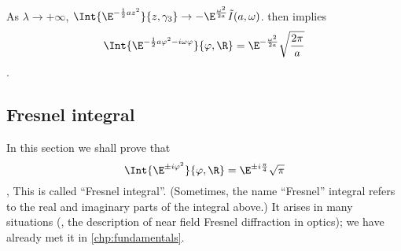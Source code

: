 As $\lambda\rightarrow+\infty$, 
   \begin{math}
   \Int{\E^{-\frac{1}{2} a z^{2}}}{z,\gamma_{3}} \rightarrow 
   - \E^{\frac{\omega^{2}}{2a}} \tilde{I}(a,\omega)
\end{math}.
 then implies
\begin{dmath*}
   \Int{\E^{-\frac{1}{2}a\varphi^{2} - i\omega \varphi }
	 }{\varphi, \R}  = 
   \E^{-\frac{\omega^{2}}{2a}}
   \sqrt{\frac{2\pi}{a}} 
\end{dmath*}.

\subsection{Fresnel integral}
\label{sec:Fresnel case}

\RestoreExp

In this section we shall prove that
\begin{dmath}[label={fresnel}]
   \Int{ \E^{\pm i\varphi^{2}}}{\varphi,\R} = \E^{\pm i\frac{\pi}{4}} \sqrt{\pi}
\end{dmath}, 
This is called ``Fresnel integral''.
(Sometimes, the name ``Fresnel'' integral refers to the real and imaginary
parts of the integral above.)
It arises in many situations (\eg, the description of near field Fresnel
diffraction in optics); we have already met it in
\cref{chp:fundamentals}.

